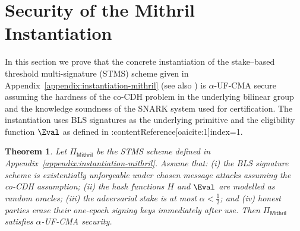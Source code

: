 \documentclass{article}
\newtheorem{theorem}{Theorem}[section]
\begin{document}
\section{Security of the Mithril Instantiation}
\label{sec:mithril-security}

In this section we prove that the concrete instantiation of the
stake–based threshold multi-signature (STMS) scheme given in
Appendix~\ref{appendix:instantiation-mithril} (see also
\cite{ChaidosKiayiasMithril2024}) is
$\alpha$-UF-CMA secure assuming the hardness
of the co-CDH problem in the underlying bilinear group and the
knowledge soundness of the SNARK system used for certification.
The instantiation uses BLS signatures as the underlying primitive
and the eligibility function $\Eval$ as defined in
\cite{WuyunSTMSBlueprint2025}:contentReference[oaicite:1]{index=1}.

\begin{theorem}
\label{thm:mithril-ufcma}
Let $\Pi_{\mathsf{Mithril}}$ be the STMS scheme defined in
Appendix~\ref{appendix:instantiation-mithril}.  Assume that:
(i) the BLS signature scheme is existentially unforgeable under chosen
message attacks assuming the co-CDH assumption;
(ii) the hash functions $H$ and $\Eval$ are modelled as random oracles;
(iii) the adversarial stake is at most $\alpha<\frac12$; and
(iv) honest parties erase their one-epoch signing keys immediately after
use. Then $\Pi_{\mathsf{Mithril}}$ satisfies $\alpha$-UF-CMA security.
\end{theorem}
\end{document}
